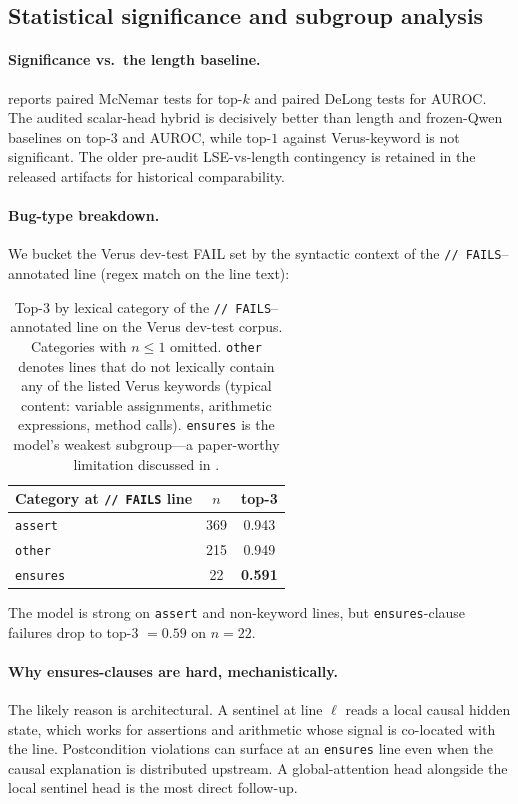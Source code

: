 \documentclass[10pt]{article}
\begin{document}
\subsection{Statistical significance and subgroup analysis}
\label{sec:results:significance}

\paragraph{Significance vs.\ the length baseline.}
 reports paired McNemar tests for top-$k$ and
paired DeLong tests for AUROC. The audited scalar-head hybrid is
decisively better than length and frozen-Qwen baselines on top-$3$ and
AUROC, while top-$1$ against Verus-keyword is not significant. The
older pre-audit LSE-vs-length contingency is retained in the released
artifacts for historical comparability.

\paragraph{Bug-type breakdown.}
We bucket the Verus dev-test FAIL set by the syntactic context of the
\texttt{// FAILS}--annotated line (regex match on the line text):

\begin{table}[htbp]
\centering
\caption{Top-3 by lexical category of the \texttt{// FAILS}--annotated line on
the Verus dev-test corpus. Categories with $n \le 1$ omitted. \texttt{other}
denotes lines that do not lexically contain any of the listed Verus
keywords (typical content: variable assignments, arithmetic
expressions, method calls). \texttt{ensures} is the model's weakest
subgroup---a paper-worthy limitation discussed in
.}
\label{tab:bug-type}
\small
\begin{tabular}{lcc}
\toprule
Category at \texttt{// FAILS} line & $n$ & top-3 \\
\midrule
\texttt{assert}     & 369 & 0.943 \\
\texttt{other}      & 215 & 0.949 \\
\texttt{ensures}    & 22  & \textbf{0.591} \\
\bottomrule
\end{tabular}
\end{table}

The model is strong on \texttt{assert} and non-keyword lines, but
\texttt{ensures}-clause failures drop to top-3 $=0.59$ on $n=22$.

\paragraph{Why ensures-clauses are hard, mechanistically.}
The likely reason is architectural. A sentinel at line $\ell$ reads a
local causal hidden state, which works for assertions and arithmetic
whose signal is co-located with the line. Postcondition violations can
surface at an \texttt{ensures} line even when the causal explanation is
distributed upstream. A global-attention head alongside the local
sentinel head is the most direct follow-up.
\end{document}
